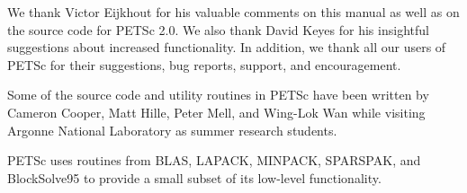 

\medskip \medskip 
We thank Victor Eijkhout for his valuable comments on this
manual as well as on the source code for PETSc 2.0.  We also thank David
Keyes for his insightful suggestions about increased functionality.
In addition, we thank all our users  of PETSc for
their suggestions, bug reports, support, and encouragement.

\vspace{.3in}
Some of the source code and utility routines in PETSc have been
written by Cameron Cooper, Matt Hille, Peter Mell, and Wing-Lok Wan
while visiting Argonne National Laboratory as summer research
students.

\vspace{.3in}
PETSc uses routines from BLAS, LAPACK, MINPACK, SPARSPAK, and BlockSolve95 to
provide a small subset of its low-level functionality.
